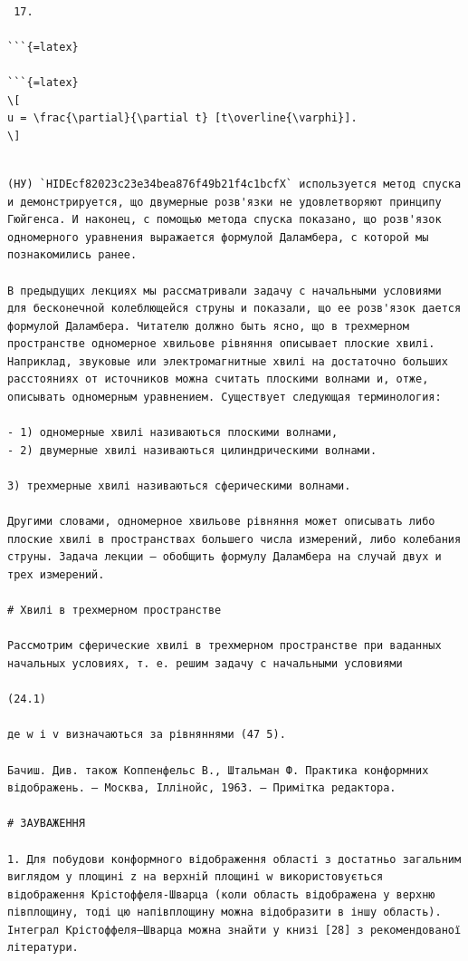 \documentclass[
  ukrainian,
]{article}
\begin{document}
\begin{verbatim}

 17.

```{=latex}

```{=latex}
\[
u = \frac{\partial}{\partial t} [t\overline{\varphi}].
\]
\end{verbatim}

\begin{verbatim}

(НУ) `HIDEcf82023c23e34bea876f49b21f4c1bcfX` используется метод спуска и демонстрируется, що двумерные розв'язки не удовлетворяют принципу Гюйгенса. И наконец, с помощью метода спуска показано, що розв'язок одномерного уравнения выражается формулой Даламбера, с которой мы познакомились ранее.

В предыдущих лекциях мы рассматривали задачу с начальными условиями для бесконечной колеблющейся струны и показали, що ее розв'язок дается формулой Даламбера. Читателю должно быть ясно, що в трехмерном пространстве одномерное хвильове рівняння описывает плоские хвилі. Наприклад, звуковые или электромагнитные хвилі на достаточно больших расстояниях от источников можна считать плоскими волнами и, отже, описывать одномерным уравнением. Существует следующая терминология:

- 1) одномерные хвилі називаються плоскими волнами,
- 2) двумерные хвилі називаються цилиндрическими волнами.

3) трехмерные хвилі називаються сферическими волнами.

Другими словами, одномерное хвильове рівняння может описывать либо плоские хвилі в пространствах большего числа измерений, либо колебания струны. Задача лекции — обобщить формулу Даламбера на случай двух и трех измерений.

# Хвилі в трехмерном пространстве

Рассмотрим сферические хвилі в трехмерном пространстве при ваданных начальных условиях, т. е. решим задачу с начальными условиями

(24.1)

де w і v визначаються за рівняннями (47 5).

Бачиш. Див. також Коппенфельс В., Штальман Ф. Практика конформних відображень. — Москва, Іллінойс, 1963. — Примітка редактора.

# ЗАУВАЖЕННЯ

1. Для побудови конформного відображення області з достатньо загальним виглядом у площині z на верхній площині w використовується відображення Крістоффеля-Шварца (коли область відображена у верхню півплощину, тоді цю напівплощину можна відобразити в іншу область). Інтеграл Крістоффеля–Шварца можна знайти у книзі [28] з рекомендованої літератури.


\end{verbatim}
\end{document}
